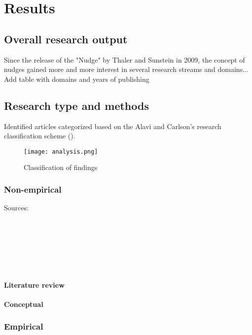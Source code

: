 \section{Results}

\subsection{Overall research output}
Since the release of the "Nudge" by Thaler and Sunstein in 2009, the concept of nudges gained more and more interest in several research streams and domains...
Add table with domains and years of publishing


\subsection{Research type and methods}
Identified articles categorized based on the Alavi and Carlson's research classification scheme (\cite{alavi_review_1992}).

\begin{figure}[h!]
    \centering
    \texttt{[image: analysis.png]}
    \caption{Classification of findings}
    \label{fig:analysis}
\end{figure}


\subsubsection{Non-empirical}
Sources:
\cite{cao_economic_2018} \\
\cite{yoo_consumer_2018} \\
\cite{gamliel_average_2017} \\
\cite{munscher_review_2016} \\
\cite{broniarczyk_decision_2014} \\
\cite{lades_impulsive_2014} \\
\cite{dolan_influencing_2012} \\
\paragraph{Literature review}
\paragraph{Conceptual}

\subsubsection{Empirical}
